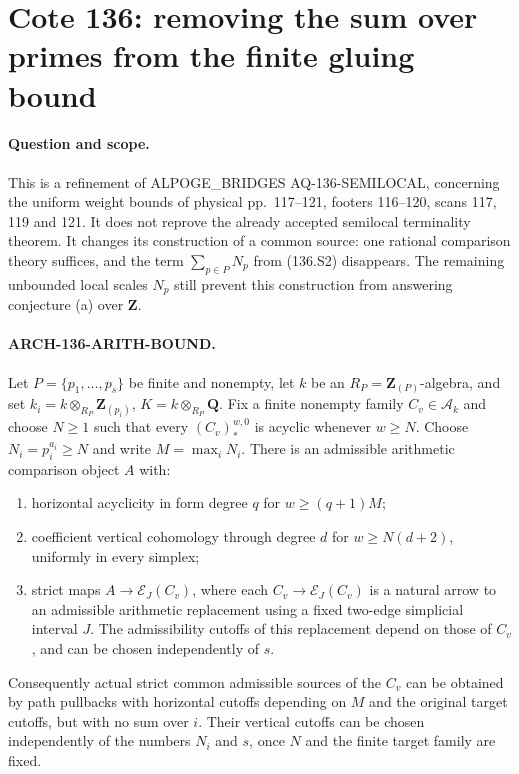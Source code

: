 \section{Cote 136: removing the sum over primes from the finite gluing bound}
\label{sec:136arithmetic}

\paragraph{Question and scope.}
This is a refinement of ALPOGE\_BRIDGES AQ-136-SEMILOCAL, concerning
the uniform weight bounds of physical pp.~117--121, footers
116--120, scans 117, 119 and 121.  It does not reprove the already
accepted semilocal terminality theorem.  It changes its construction
of a common source: one rational comparison theory suffices, and the
term $\sum_{p\in P}N_p$ from (136.S2) disappears.  The remaining
unbounded local scales $N_p$ still prevent this construction from
answering conjecture (a) over $\mathbf Z$.

\paragraph{ARCH-136-ARITH-BOUND.}
Let $P=\{p_1,\ldots,p_s\}$ be finite and nonempty, let $k$ be an
$R_P=\mathbf Z_{(P)}$-algebra, and set
$k_i=k\otimes_{R_P}\mathbf Z_{(p_i)}$, $K=k\otimes_{R_P}\mathbf Q$.
Fix a finite nonempty family $C_v\in\mathcal A_k$ and choose $N\geq1$
such that every $(C_v)_*^{w,0}$ is acyclic whenever $w\geq N$.
Choose $N_i=p_i^{a_i}\geq N$ and write $M=\max_iN_i$.
There is an admissible arithmetic comparison object $A$ with:
\begin{enumerate}
\item horizontal acyclicity in form degree $q$ for $w\geq(q+1)M$;
\item coefficient vertical cohomology through degree $d$ for
      $w\geq N(d+2)$, uniformly in every simplex;
\item strict maps $A\to\mathcal E_J(C_v)$, where each
      $C_v\to\mathcal E_J(C_v)$ is a natural arrow to an admissible
      arithmetic replacement using a fixed two-edge simplicial interval
      $J$.  The admissibility cutoffs of this replacement depend on
      those of $C_v$, and can be chosen independently of $s$.
\end{enumerate}
Consequently actual strict common admissible sources of the $C_v$
can be obtained by path pullbacks with horizontal cutoffs depending
on $M$ and the original target cutoffs, but with no sum over $i$.
Their vertical cutoffs can be chosen independently of the numbers
$N_i$ and $s$, once $N$ and the finite target family are fixed.

